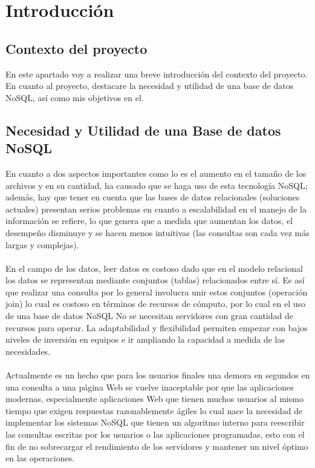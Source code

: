 \documentclass[60pt]{article}
\begin{document}
\newpage

\section{Introducción}
\subsection{Contexto del proyecto}
En este apartado voy a realizar una breve introducción del contexto del proyecto. En cuanto al proyecto, destacare la necesidad y utilidad de una base de datos NoSQL,
así como mis objetivos en el.
\subsection{Necesidad y Utilidad de una Base de datos NoSQL}
En cuanto a dos aspectos importantes como lo es el aumento en el tamaño
de los archivos y en su cantidad, ha causado que
se haga uso de esta tecnología NoSQL;
además, hay que tener en cuenta que las bases de
datos relacionales (soluciones actuales) presentan
serios problemas en cuanto a escalabilidad en el
manejo de la información se refiere, lo que genera
que a medida que aumentan los datos, el desempeño
disminuye y se hacen menos intuitivas (las consultas
son cada vez más largas y complejas).
\\
\\
En el campo de los datos, leer datos es costoso dado que en el modelo relacional los datos se representan mediante conjuntos (tablas) relacionados entre sí. Es así que realizar una consulta por lo general involucra unir estos conjuntos (operación join) lo cual es costoso en términos de recursos de cómputo, por lo cual en el uso de una base de datos NoSQL No se necesitan servidores con gran cantidad de recursos para operar. La adaptabilidad y flexibilidad permiten empezar con bajos niveles de inversión en equipos e ir ampliando la capacidad a medida de las necesidades.
\\
\\
Actualmente es un hecho que para los usuarios finales
una demora en segundos en una consulta a una página
Web se vuelve inaceptable por que las
aplicaciones modernas, especialmente aplicaciones
Web que tienen muchos usuarios al mismo tiempo que
exigen respuestas razonablemente ágiles lo cual nace la necesidad de implementar los sistemas NoSQL que tienen un algoritmo interno para reescribir las consultas escritas por los usuarios o las aplicaciones programadas, esto con el fin de no sobrecargar el rendimiento de los servidores y mantener un nivel óptimo en las operaciones.
\\
\end{document}
